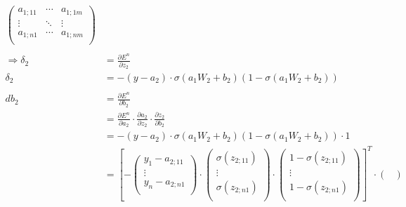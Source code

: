 \begin{align*}
\begin{pmatrix}
                                                                        a_{1;11} & \cdots & a_{1;1m} \\
                                                                        \vdots & \ddots & \vdots \\
                                                                        a_{1;n1}&\cdots & a_{1;nm}  \\
                                                                        \end{pmatrix}\\\\
    \Rightarrow \delta_{2} &= \frac{\partial E^{n}}{\partial z_{2}}\\
     \delta_{2} &= -(y-a_{2}) \cdot \sigma(a_{1}W_{2}+b_{2})(1-\sigma(a_{1}W_{2}+b_{2}))\\\\
    db_{2} &= \frac{\partial E^{n}}{\partial b_{2}}\\
    &= \frac{\partial E^{n}}{\partial a_{2}} \cdot \frac{\partial a_{2}}{\partial z_{2}} \cdot \frac{\partial z_{2}}{\partial b_{2}}\\
    &= -(y-a_{2}) \cdot \sigma(a_{1}W_{2}+b_{2})(1-\sigma(a_{1}W_{2}+b_{2})) \cdot 1\\
    &=\left[-\begin{pmatrix}
        y_{1}  -  a_{2;11} \\
        \vdots \\
        y_{n}  -  a_{2;n1}  \\
        \end{pmatrix} \cdot \begin{pmatrix}
                            \sigma (z_{2;11}) \\
                            \vdots \\
                            \sigma (z_{2;n1})  \\
                            \end{pmatrix} \cdot \begin{pmatrix}
                                                    1-\sigma (z_{2;11}) \\
                                                    \vdots \\
                                                    1-\sigma (z_{2;n1})  \\
                                                    \end{pmatrix}\right]^{T} \cdot \begin{pmatrix}

\end{pmatrix}
\end{align*}
